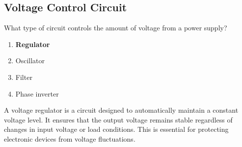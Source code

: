 \subsection{Voltage Control Circuit}
\label{T6D05}

\begin{tcolorbox}[colback=gray!10!white,colframe=black!75!black,title=T6D05]
What type of circuit controls the amount of voltage from a power supply?
\begin{enumerate}[noitemsep]
    \item \textbf{Regulator}
    \item Oscillator
    \item Filter
    \item Phase inverter
\end{enumerate}
\end{tcolorbox}

A voltage regulator is a circuit designed to automatically maintain a constant voltage level. It ensures that the output voltage remains stable regardless of changes in input voltage or load conditions. This is essential for protecting electronic devices from voltage fluctuations.